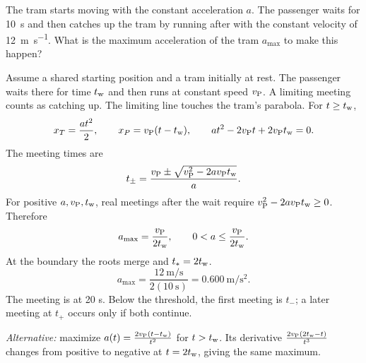 \quiznextproblem
\begin{problem}[25 pts]
The tram starts moving with the constant acceleration $a$.
The passenger waits for \qty{10}{\second} and then catches up the tram
by running after with the constant velocity of
\qty{12}{\metre\per\second}. What is the maximum acceleration of the
tram $a_{\max}$ to make this happen?
\end{problem}
\begin{solution}
Assume a shared starting position and a tram initially at rest.
The passenger waits there for time $t_{\rm w}$ and then runs at constant speed $v_{\rm P}$.
A limiting meeting counts as catching up.
The limiting line touches the tram's parabola.
For $t\geq t_{\rm w}$,
\[
x_T=\frac{at^2}{2},\qquad x_P=v_{\rm P}(t-t_{\rm w}),\qquad
at^2-2v_{\rm P}t+2v_{\rm P}t_{\rm w}=0.
\]
The meeting times are
\[
t_\pm=\frac{v_{\rm P}\pm\sqrt{v_{\rm P}^2-2av_{\rm P}t_{\rm w}}}{a}.
\]
For positive $a,v_{\rm P},t_{\rm w}$, real meetings after the wait require
$v_{\rm P}^2-2av_{\rm P}t_{\rm w}\geq0$. Therefore
\[
a_{\max}=\frac{v_{\rm P}}{2t_{\rm w}},\qquad
0<a\leq\frac{v_{\rm P}}{2t_{\rm w}}.
\]
At the boundary the roots merge and $t_*=2t_{\rm w}$.
\[
a_{\max}=
\frac{\qty{12}{\metre\per\second}}{2(\qty{10}{\second})}
=\qty{0.600}{\metre\per\second\squared}.
\]
The meeting is at 20 s. Below the threshold, the first meeting is $t_-$;
a later meeting at $t_+$ occurs only if both continue.

\textit{Alternative:} maximize
$a(t)=\frac{2v_{\rm P}(t-t_{\rm w})}{t^2}$ for $t>t_{\rm w}$.
Its derivative $\frac{2v_{\rm P}(2t_{\rm w}-t)}{t^3}$ changes from positive to
negative at $t=2t_{\rm w}$, giving the same maximum.
\end{solution}

